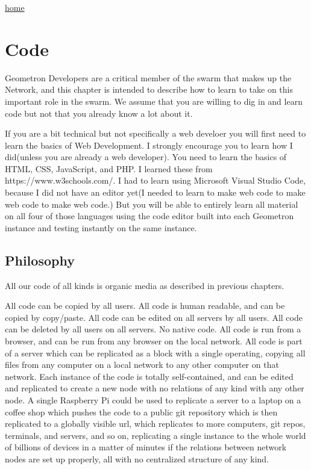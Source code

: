 \href{index.html}{home}

\section{Code}\label{code}

Geometron Developers are a critical member of the swarm that makes up the Network, and this chapter is intended to describe how to learn to take on this important role in the swarm.  We assume that you are willing to dig in and learn code but not that you already know a lot about it.

If you are a bit technical but not specifically a web develoer you will first need to learn the basics of Web Development. I strongly encourage you to learn how I did(unless you are already a web developer).  You need to learn the basics of HTML, CSS, JavaScript, and PHP.  I learned these from https://www.w3schools.com/.  I had to learn using Microsoft Visual Studio Code, because I did not have an editor yet(I needed to learn to make web code to make web code to make web code.) But you will be able to entirely learn all material on all four of those languages using the code editor built into each Geometron instance and testing instantly on the same instance. 

\subsection{Philosophy}

All our code of all kinds is organic media as described in previous chapters.

All code can be copied by all users. All code is human readable, and can be copied by copy/paste.  All code can be edited on all servers by all users.  All code can be deleted by all users on all servers.  No native code.  All code is run from a browser, and can be run from any browser on the local network.  All code is part of a server which can be replicated as a block with a single operating, copying all files from any computer on a local network to any other computer on that network.  Each instance of the code is totally self-contained, and can be edited and replicated to create a new node with no relations of any kind with any other node.  A single Raspberry Pi could be used to replicate a server to a laptop on a coffee shop which pushes the code to a public git repository which is then replicated to a globally visible url, which replicates to more computers, git repos, terminals, and servers, and so on, replicating a single instance to the whole world of billions of devices in a matter of minutes if the relations between network nodes are set up properly, all with no centralized structure of any kind.  

